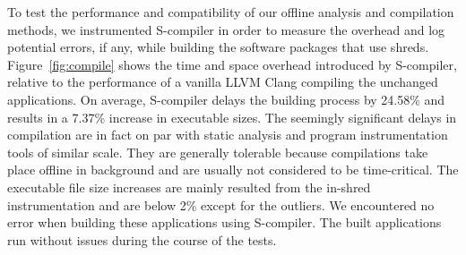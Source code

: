 To test the performance and compatibility of our offline analysis and compilation methods, we instrumented S-compiler in order to measure the overhead and log potential errors, if any, while building  the \numopensource software packages that use shreds. 
Figure~\ref{fig:compile} shows the time and space overhead introduced by S-compiler, relative to the performance of a vanilla LLVM Clang compiling the unchanged applications. On average, S-compiler delays the building process by 24.58\% and results in a 7.37\% increase in executable sizes. The seemingly significant delays in compilation are in fact on par with static analysis and program instrumentation tools of similar scale. They are generally tolerable because compilations take place offline in background and are usually not considered to be time-critical. The executable file size increases are mainly resulted from the in-shred instrumentation and are below 2\% except for the outliers. 
%
We encountered no error when building these applications using S-compiler. The built applications run without issues during the course of the tests. 



